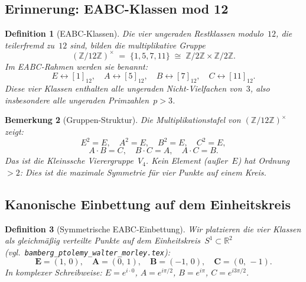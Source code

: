 \documentclass[12pt,a4paper]{article}
\newtheorem{definition}{Definition}[section]
\newtheorem{bemerkung}[definition]{Bemerkung}
\newcommand{\Z}{\mathbb{Z}}
\newcommand{\R}{\mathbb{R}}
\begin{document}
\subsection{Erinnerung: EABC-Klassen mod 12}

\begin{definition}[EABC-Klassen]
\label{def:eabc}
Die vier ungeraden Restklassen modulo~$12$, die teilerfremd zu~$12$ sind,
bilden die multiplikative Gruppe
\[
  (\Z/12\Z)^\times \;=\; \{1,5,7,11\} \;\cong\; \Z/2\Z \times \Z/2\Z.
\]
Im EABC-Rahmen werden sie benannt:
\[
  E \leftrightarrow [1]_{12},\quad
  A \leftrightarrow [5]_{12},\quad
  B \leftrightarrow [7]_{12},\quad
  C \leftrightarrow [11]_{12}.
\]
Diese vier Klassen enthalten alle ungeraden Nicht-Vielfachen von~$3$,
also insbesondere alle ungeraden Primzahlen~$p > 3$.
\end{definition}

\begin{bemerkung}[Gruppen-Struktur]
Die Multiplikationstafel von $(\Z/12\Z)^\times$ zeigt:
\[
  E^2 = E,\quad A^2 = E,\quad B^2 = E,\quad C^2 = E,
\]
\[
  A \cdot B = C,\quad B \cdot C = A,\quad A \cdot C = B.
\]
Das ist die Kleinssche Vierergruppe~$V_4$. Kein Element (außer~$E$) hat
Ordnung~$> 2$: Dies ist die maximale Symmetrie für vier Punkte auf einem Kreis.
\end{bemerkung}

\subsection{Kanonische Einbettung auf dem Einheitskreis}

\begin{definition}[Symmetrische EABC-Einbettung]
\label{def:einbettung}
Wir platzieren die vier Klassen als gleichmäßig verteilte Punkte auf
dem Einheitskreis~$S^1 \subset \R^2$ (vgl.\ \texttt{bamberg\_ptolemy\_walter\_morley.tex}):
\[
  \mathbf{E} = (1,\,0),\quad
  \mathbf{A} = (0,\,1),\quad
  \mathbf{B} = (-1,\,0),\quad
  \mathbf{C} = (0,\,-1).
\]
In komplexer Schreibweise: $E = e^{i\cdot 0}$, $A = e^{i\pi/2}$,
$B = e^{i\pi}$, $C = e^{i3\pi/2}$.
\end{definition}
\end{document}
